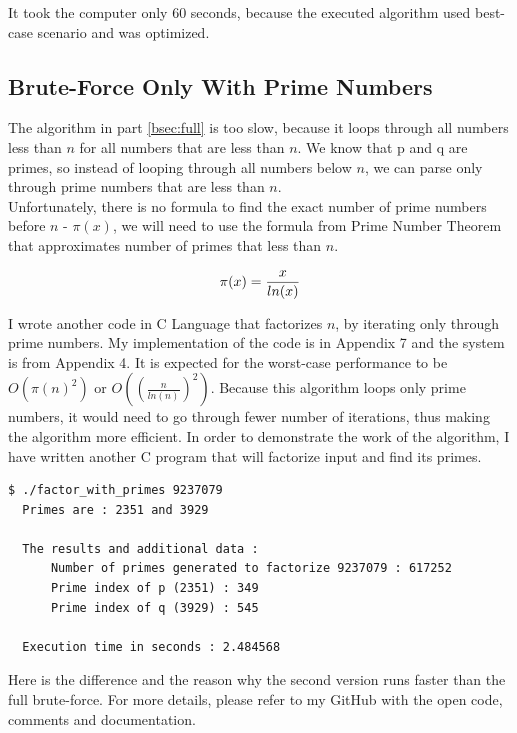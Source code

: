 \documentclass[a4paper, 12pt]{article}
\begin{document}
It took the computer only 60 seconds, because the executed algorithm used best-case scenario and was optimized.\cite{github}

\subsection{Brute-Force Only With Prime Numbers}
\label{bsec:primes}

The algorithm in part \ref{bsec:full} is too slow, because it loops through all numbers less than $n$ for all
numbers that are less than $n$. We know that p and q are primes, so instead of looping through all
numbers below $n$, we can parse only through prime numbers that are less than $n$.\\
Unfortunately, there is no formula to find the exact number of prime numbers before $n$ - $\pi(x)$, we will need to use
the formula from Prime Number Theorem that approximates number of primes that less than $n$\cite{pi}.

\begin{equation}
  \pi(x)=\frac{x}{ln(x)}\\
  \end{equation}

I wrote another code in C\cite{Clang} Language that factorizes $n$, by iterating only through prime
numbers. My implementation of the code is in Appendix 7 and the system is from Appendix 4.
It is expected for the worst-case performance to be $O(\pi(n)^2)$ or $O((\frac{n}{ln(n)})^2)$.
Because this algorithm loops only prime
numbers, it would need to go through fewer number of iterations, thus making the algorithm more efficient.
In order to demonstrate the work of the algorithm, I have written another C program that will factorize
input and find its primes.

\begin{lstlisting}[caption=Demonstartion of Prime Factorization with Primes]
  $ ./factor_with_primes 9237079
  Primes are : 2351 and 3929

  The results and additional data :
      Number of primes generated to factorize 9237079 : 617252
      Prime index of p (2351) : 349
      Prime index of q (3929) : 545
      
  Execution time in seconds : 2.484568
  \end{lstlisting}

Here is the difference and the reason why the second version runs faster than the full brute-force.
For more details, please refer to my GitHub with the open code, comments and documentation. 
\end{document}
